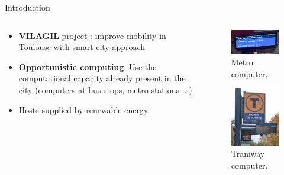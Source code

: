 \documentclass[Ligatures=TeX,table,svgnames,usetotalslideindicator,compress,10pt,aspectratio=169]{beamer}
\begin{document}
\begin{frame}{Introduction}  

\begin{columns}
    
\begin{column}{0.6\textwidth}
\begin{itemize}
    \item \textbf{VILAGIL} project : improve mobility in Toulouse with smart city approach
    \item \textbf{Opportunistic computing}: Use the computational capacity already present in the city (computers at bus stops, metro stations ...)
    \item Hosts supplied by renewable energy
\end{itemize}
    \end{column}


\begin{column}{0.5\textwidth}

   \begin{figure}[!h]
        \centering
        \includegraphics[width=.7\textwidth]{images/metro.png}
        \caption{Metro computer.}
      \end{figure}


   \begin{figure}[!h]
        \centering
        \includegraphics[width=.4\textwidth]{images/tramway.png}
        \caption{Tramway computer.}
      \end{figure}

\end{column}

\end{columns}


\end{frame}
\end{document}
